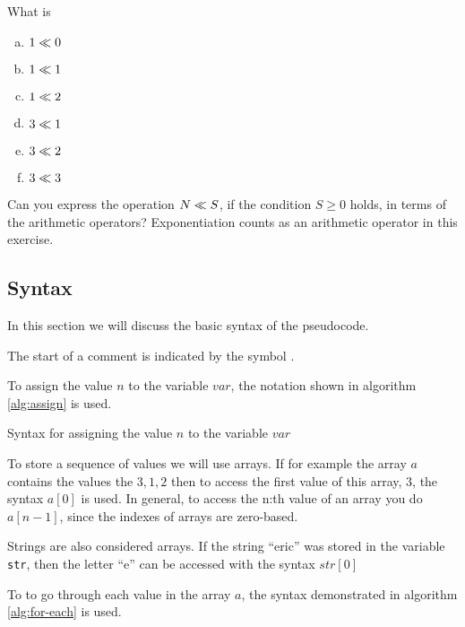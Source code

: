 \begin{Exercise}[label={bit-equiv}]

  What is

  \begin{enumerate}[(a)]
  \item $1 \ll 0$
  \item $1 \ll 1$
  \item $1 \ll 2$
  \item $3 \ll 1$
  \item $3 \ll 2$
  \item $3 \ll 3$
  \end{enumerate}

  Can you express the operation $N \ll S$, if the condition $S
  \geq 0$ holds, in terms of the arithmetic operators? Exponentiation
  counts as an arithmetic operator in this exercise.

\end{Exercise}


\subsection{Syntax}

In this section we will discuss the basic syntax of the pseudocode.

The start of a comment is indicated by the symbol \commentsymbol.

To assign the value $n$ to the variable $var$, the notation shown in
algorithm \ref{alg:assign} is used.

\begin{algorithm}[H]
  \caption{Syntax for assigning the value $n$ to the variable $var$}
  \label{alg:assign}
  \begin{algorithmic}[1]
  \end{algorithmic}
\end{algorithm}

To store a sequence of values we will use arrays. If for example the
array $a$ contains the values the $3,1,2$ then to access the first
value of this array, $3$, the syntax $a[0]$ is used. In general, to
access the n:th value of an array you do $a[n-1]$, since the indexes
of arrays are zero-based.

Strings are also considered arrays. If the string ``eric'' was
stored in the variable \texttt{str}, then the letter ``e'' can be
accessed with the syntax $str[0]$

To to go through each value in the array $a$, the syntax demonstrated
in algorithm \ref{alg:for-each} is used.

